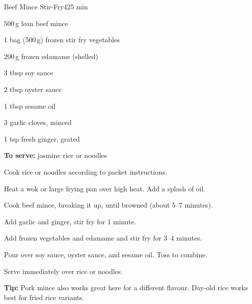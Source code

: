\begin{recipebox}{Beef Mince Stir-Fry}{4}{25 min}
\begin{ingredients}
  \item 500\,g lean beef mince
  \item 1 bag (500\,g) frozen stir fry vegetables
  \item 200\,g frozen edamame (shelled)
  \item 3 tbsp soy sauce
  \item 2 tbsp oyster sauce
  \item 1 tbsp sesame oil
  \item 3 garlic cloves, minced
  \item 1 tsp fresh ginger, grated
  \item \textbf{To serve:} jasmine rice or noodles
\end{ingredients}

\begin{method}
  \item Cook rice or noodles according to packet instructions.
  \item Heat a wok or large frying pan over high heat. Add a splash of oil.
  \item Cook beef mince, breaking it up, until browned (about 5--7 minutes).
  \item Add garlic and ginger, stir fry for 1 minute.
  \item Add frozen vegetables and edamame and stir fry for 3--4 minutes.
  \item Pour over soy sauce, oyster sauce, and sesame oil. Toss to combine.
  \item Serve immediately over rice or noodles.
\end{method}

\begin{notelist}
  \item \textbf{Tip:} Pork mince also works great here for a different flavour. Day-old rice works best for fried rice variants.
\end{notelist}
\end{recipebox}
